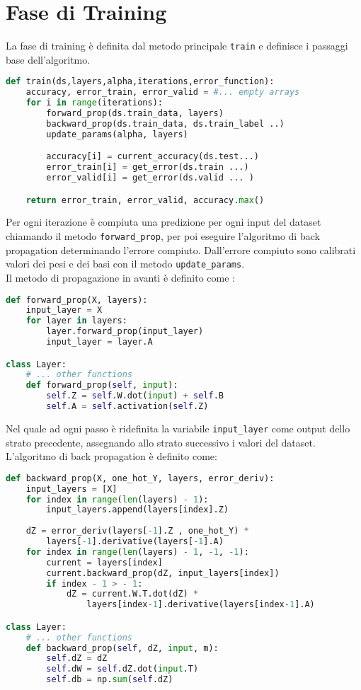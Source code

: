 \section{Fase di Training}
La fase di training è definita dal metodo principale \texttt{train} e definisce i passaggi base dell'algoritmo.
\begin{lstlisting}[language=Python]
def train(ds,layers,alpha,iterations,error_function):
    accuracy, error_train, error_valid = #... empty arrays
    for i in range(iterations):
        forward_prop(ds.train_data, layers)
        backward_prop(ds.train_data, ds.train_label ..)
        update_params(alpha, layers)

        accuracy[i] = current_accuracy(ds.test...)
        error_train[i] = get_error(ds.train ...)
        error_valid[i] = get_error(ds.valid ... )

    return error_train, error_valid, accuracy.max()
\end{lstlisting}
Per ogni iterazione è compiuta una predizione per ogni input del dataset chiamando il metodo \texttt{forward\_prop}, per poi eseguire l'algoritmo di back propagation determinando l'errore compiuto. Dall'errore compiuto sono calibrati valori dei pesi e dei basi con il metodo \texttt{update\_params}. \\
Il metodo di propagazione in avanti è definito come :
\begin{lstlisting}[language=Python]
def forward_prop(X, layers):
    input_layer = X
    for layer in layers:
        layer.forward_prop(input_layer)
        input_layer = layer.A

class Layer:
    # ... other functions
    def forward_prop(self, input):
        self.Z = self.W.dot(input) + self.B
        self.A = self.activation(self.Z)
\end{lstlisting}
Nel quale ad ogni passo è ridefinita la variabile \texttt{input\_layer} come output dello strato precedente, assegnando allo strato successivo i valori del dataset. \\
L'algoritmo di back propagation è definito come:
\begin{lstlisting}[language=Python]
def backward_prop(X, one_hot_Y, layers, error_deriv):
    input_layers = [X]
    for index in range(len(layers) - 1):
        input_layers.append(layers[index].Z)
    
    dZ = error_deriv(layers[-1].Z , one_hot_Y) *
        layers[-1].derivative(layers[-1].A)
    for index in range(len(layers) - 1, -1, -1):
        current = layers[index]
        current.backward_prop(dZ, input_layers[index])
        if index - 1 > - 1:
            dZ = current.W.T.dot(dZ) *
                layers[index-1].derivative(layers[index-1].A)

class Layer:
    # ... other functions
    def backward_prop(self, dZ, input, m):
        self.dZ = dZ
        self.dW = self.dZ.dot(input.T)
        self.db = np.sum(self.dZ)
\end{lstlisting}
